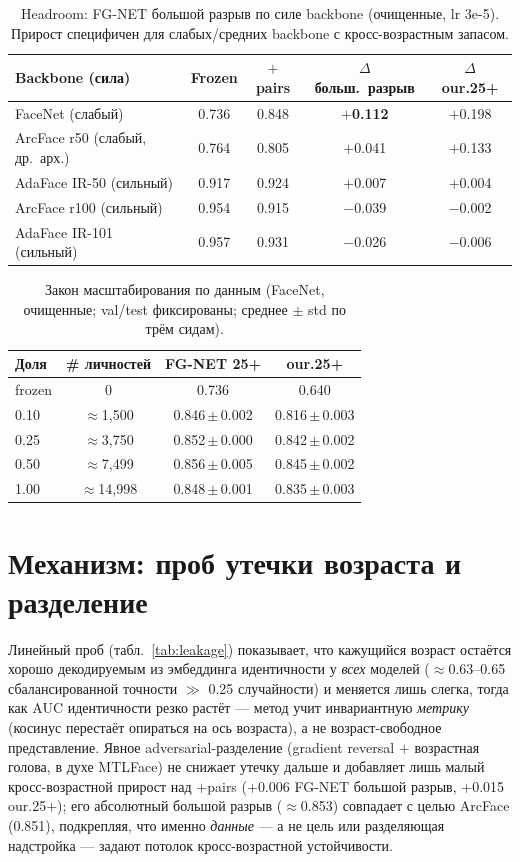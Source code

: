 \documentclass[10pt,twocolumn,letterpaper]{article}
\begin{document}
\begin{table}[t]
\centering
\small
\begin{tabular}{@{}lcccc@{}}
\toprule
Backbone (сила) & Frozen & $+$pairs & $\Delta$ больш.\ разрыв & $\Delta$ our.25+ \\
\midrule
FaceNet (слабый) & 0.736 & 0.848 & \textbf{$+$0.112} & $+$0.198 \\
ArcFace r50 (слабый, др.\ арх.) & 0.764 & 0.805 & $+$0.041 & $+$0.133 \\
AdaFace IR-50 (сильный) & 0.917 & 0.924 & $+$0.007 & $+$0.004 \\
ArcFace r100 (сильный) & 0.954 & 0.915 & $-$0.039 & $-$0.002 \\
AdaFace IR-101 (сильный) & 0.957 & 0.931 & $-$0.026 & $-$0.006 \\
\bottomrule
\end{tabular}
\caption{Headroom: FG-NET большой разрыв по силе backbone (очищенные, lr 3e-5). Прирост специфичен для
слабых/средних backbone с кросс-возрастным запасом.}
\label{tab:headroom}
\end{table}

\begin{table}[t]
\centering
\small
\setlength{\tabcolsep}{3pt}
\begin{tabular}{@{}lccc@{}}
\toprule
Доля & \# личностей & FG-NET 25+ & our.25+ \\
\midrule
frozen & 0 & 0.736 & 0.640 \\
0.10 & $\approx$1{,}500 & 0.846\,$\pm$\,0.002 & 0.816\,$\pm$\,0.003 \\
0.25 & $\approx$3{,}750 & 0.852\,$\pm$\,0.000 & 0.842\,$\pm$\,0.002 \\
0.50 & $\approx$7{,}499 & 0.856\,$\pm$\,0.005 & 0.845\,$\pm$\,0.002 \\
1.00 & $\approx$14{,}998 & 0.848\,$\pm$\,0.001 & 0.835\,$\pm$\,0.003 \\
\bottomrule
\end{tabular}
\caption{Закон масштабирования по данным (FaceNet, очищенные; val/test фиксированы; среднее $\pm$ std по
трём сидам).}
\label{tab:scaling}
\end{table}

\section{Механизм: проб утечки возраста и разделение}\label{sup:leakage}
Линейный проб (табл.~\ref{tab:leakage}) показывает, что кажущийся возраст остаётся хорошо декодируемым из
эмбеддинга идентичности у \emph{всех} моделей ($\approx$0.63--0.65 сбалансированной точности $\gg$ 0.25
случайности) и меняется лишь слегка, тогда как AUC идентичности резко растёт — метод учит инвариантную
\emph{метрику} (косинус перестаёт опираться на ось возраста), а не возраст-свободное представление. Явное
adversarial-разделение (gradient reversal $+$ возрастная голова, в духе MTLFace) не снижает утечку
дальше и добавляет лишь малый кросс-возрастной прирост над $+$pairs ($+$0.006 FG-NET большой разрыв,
$+$0.015 our.25+); его абсолютный большой разрыв ($\approx$0.853) совпадает с целью ArcFace (0.851),
подкрепляя, что именно \emph{данные} — а не цель или разделяющая надстройка — задают потолок
кросс-возрастной устойчивости.
\end{document}
